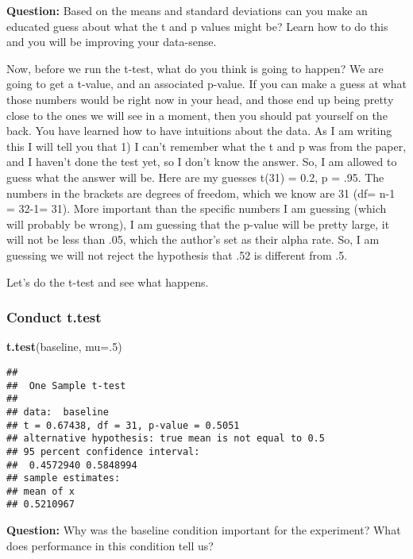 \documentclass[
]{book}
\newenvironment{Shaded}{\begin{snugshade}}{\end{snugshade}}
\newcommand{\AttributeTok}[1]{\textcolor[rgb]{0.13,0.29,0.53}{#1}}
\newcommand{\DecValTok}[1]{\textcolor[rgb]{0.00,0.00,0.81}{#1}}
\newcommand{\FunctionTok}[1]{\textcolor[rgb]{0.13,0.29,0.53}{\textbf{#1}}}
\newcommand{\NormalTok}[1]{#1}
\begin{document}
\textbf{Question:} Based on the means and standard deviations can you make an educated guess about what the t and p values might be? Learn how to do this and you will be improving your data-sense.

Now, before we run the t-test, what do you think is going to happen? We are going to get a t-value, and an associated p-value. If you can make a guess at what those numbers would be right now in your head, and those end up being pretty close to the ones we will see in a moment, then you should pat yourself on the back. You have learned how to have intuitions about the data. As I am writing this I will tell you that 1) I can't remember what the t and p was from the paper, and I haven't done the test yet, so I don't know the answer. So, I am allowed to guess what the answer will be. Here are my guesses t(31) = 0.2, p = .95. The numbers in the brackets are degrees of freedom, which we know are 31 (df= n-1 = 32-1= 31). More important than the specific numbers I am guessing (which will probably be wrong), I am guessing that the p-value will be pretty large, it will not be less than .05, which the author's set as their alpha rate. So, I am guessing we will not reject the hypothesis that .52 is different from .5.

Let's do the t-test and see what happens.

\hypertarget{conduct-t.test}{%
\subsubsection{Conduct t.test}\label{conduct-t.test}}

\begin{Shaded}
\begin{Highlighting}[]
\FunctionTok{t.test}\NormalTok{(baseline, }\AttributeTok{mu=}\NormalTok{.}\DecValTok{5}\NormalTok{)}
\end{Highlighting}
\end{Shaded}

\begin{verbatim}
## 
##  One Sample t-test
## 
## data:  baseline
## t = 0.67438, df = 31, p-value = 0.5051
## alternative hypothesis: true mean is not equal to 0.5
## 95 percent confidence interval:
##  0.4572940 0.5848994
## sample estimates:
## mean of x 
## 0.5210967
\end{verbatim}

\textbf{Question:} Why was the baseline condition important for the experiment? What does performance in this condition tell us?
\end{document}
